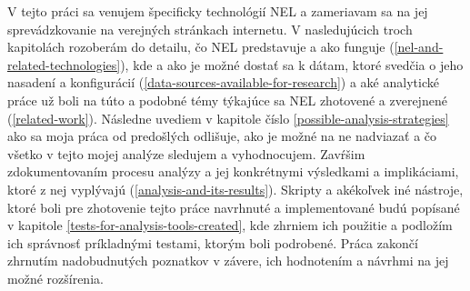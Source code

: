 V tejto práci sa venujem špecificky technológií NEL a zameriavam sa na jej sprevádzkovanie na verejných stránkach 
internetu. V nasledujúcich troch kapitolách rozoberám do detailu, čo NEL predstavuje a ako funguje 
(\ref{nel-and-related-technologies}), kde a ako je možné dostať sa k dátam, ktoré svedčia o jeho nasadení a 
konfigurácií (\ref{data-sources-available-for-research}) a aké analytické práce už boli na túto a podobné témy
týkajúce sa NEL zhotovené a zverejnené (\ref{related-work}). Následne uvediem v kapitole číslo 
\ref{possible-analysis-strategies} ako sa moja práca od predošlých odlišuje, ako je možné na ne nadviazať a čo všetko
v tejto mojej analýze sledujem a vyhodnocujem. Zavŕšim zdokumentovaním procesu analýzy a jej konkrétnymi výsledkami a 
implikáciami, ktoré z nej vyplývajú (\ref{analysis-and-its-results}). 
\newpage 
Skripty a akékoľvek iné nástroje, ktoré boli pre zhotovenie tejto práce navrhnuté a 
implementované budú popísané v kapitole \ref{tests-for-analysis-tools-created}, kde zhrniem ich použitie a podložím 
ich správnosť príkladnými testami, ktorým boli podrobené. Práca zakončí zhrnutím nadobudnutých poznatkov v závere, ich 
hodnotením a návrhmi na jej možné rozšírenia. 
